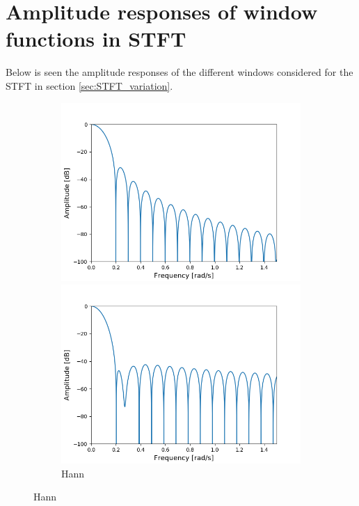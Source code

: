 \chapter{Amplitude responses of window functions in STFT}\label{appD}
Below is seen the amplitude responses of the different windows considered for the STFT in section \ref{sec:STFT_variation}.

\begin{figure}[H]
\centering

\begin{subfigure}{0.49\textwidth}
\centering
\includegraphics[width=\textwidth]{figures/dbplots/stft_bilag/64/hann.png}
\caption{Hann}
\centering
\includegraphics[width=\textwidth]{figures/dbplots/stft_bilag/64/hamming.png}

\end{subfigure}
\end{figure}
